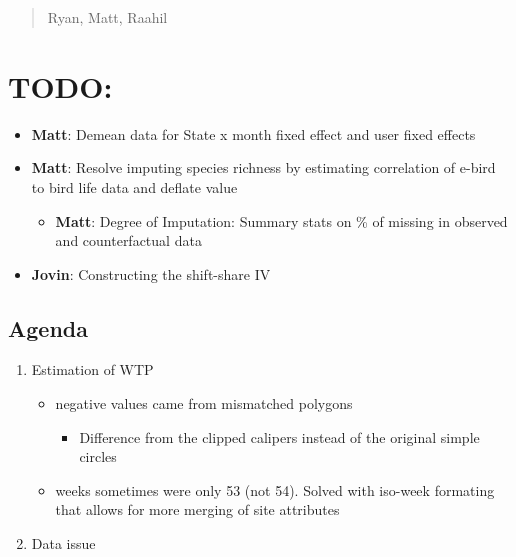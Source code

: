 \documentclass[
  letterpaper,
]{article}
\providecommand{\tightlist}{%
  \setlength{\itemsep}{0pt}\setlength{\parskip}{0pt}}\usepackage{longtable,booktabs,array}
\begin{document}
\begin{tcolorbox}[enhanced jigsaw, bottomrule=.15mm, coltitle=black, opacityback=0, opacitybacktitle=0.6, titlerule=0mm, leftrule=.75mm, arc=.35mm, toptitle=1mm, title=\textcolor{quarto-callout-note-color}{\faInfo}\hspace{0.5em}{8/15/2025}, bottomtitle=1mm, colbacktitle=quarto-callout-note-color!10!white, breakable, colback=white, colframe=quarto-callout-note-color-frame, rightrule=.15mm, toprule=.15mm, left=2mm]

\begin{quote}
Ryan, Matt, Raahil
\end{quote}

\section{TODO:}\label{todo}

\begin{itemize}
\tightlist
\item
  \textbf{Matt}: Demean data for State x month fixed effect and user
  fixed effects
\item
  \textbf{Matt}: Resolve imputing species richness by estimating
  correlation of e-bird to bird life data and deflate value

  \begin{itemize}
  \tightlist
  \item
    \textbf{Matt}: Degree of Imputation: Summary stats on \% of missing
    in observed and counterfactual data
  \end{itemize}
\item
  \textbf{Jovin}: Constructing the shift-share IV
\end{itemize}

\subsection{Agenda}\label{agenda}

\begin{enumerate}
\def\labelenumi{\arabic{enumi}.}
\tightlist
\item
  Estimation of WTP

  \begin{itemize}
  \tightlist
  \item
    negative values came from mismatched polygons

    \begin{itemize}
    \tightlist
    \item
      Difference from the clipped calipers instead of the original
      simple circles
    \end{itemize}
  \item
    weeks sometimes were only 53 (not 54). Solved with iso-week
    formating that allows for more merging of site attributes
  \end{itemize}
\item
  Data issue


\end{enumerate}
\end{tcolorbox}
\end{document}
